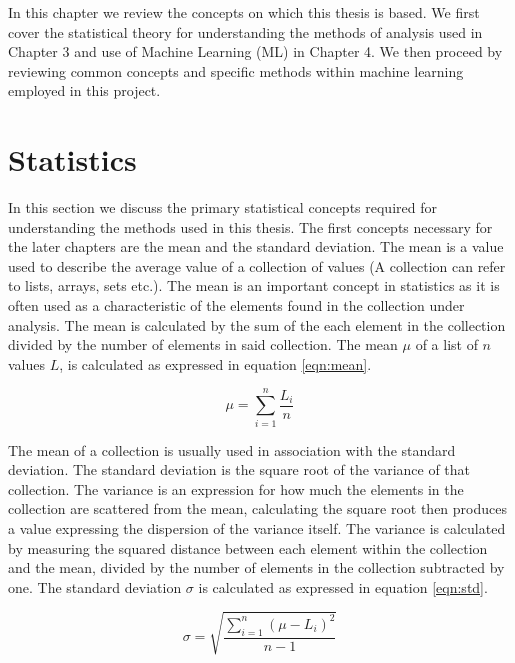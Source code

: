 In this chapter we review the concepts on which this thesis is based. We first cover the statistical theory for understanding the methods of analysis used in Chapter 3 and use of Machine Learning (ML) in Chapter 4. We then proceed by reviewing common concepts and specific methods within machine learning employed in this project.


\section{Statistics}

In this section we discuss the primary statistical concepts required for understanding the methods used in this thesis. The first concepts necessary for the later chapters are the mean and the standard deviation. The mean is a value used to describe the average value of a collection of values (A collection can refer to lists, arrays, sets etc.). The mean is an important concept in statistics as it is often used as a characteristic of the elements found in the collection under analysis. The mean is calculated by the sum of the each element in the collection divided by the number of elements in said collection. The mean $\mu$ of a list of $n$ values $L$, is calculated as expressed in equation \ref{eqn:mean}.

\begin{equation}
\label{eqn:mean}
\mu = \sum_{i=1}^n \frac{L_i}{n}
\end{equation}

The mean of a collection is usually used in association with the standard deviation. The standard deviation is the square root of the variance of that collection. The variance is an expression for how much the elements in the collection are scattered from the mean, calculating the square root then produces a value expressing the dispersion of the variance itself. The variance is calculated by measuring the squared distance between each element within the collection and the mean, divided by the number of elements in the collection subtracted by one. The standard deviation $\sigma$ is calculated as expressed in equation \ref{eqn:std}.

\begin{equation}
\label{eqn:std}
 \sigma = \sqrt{\frac{\sum_{i = 1}^{n} (\mu - L_i)^2}{n-1}}
\end{equation}

